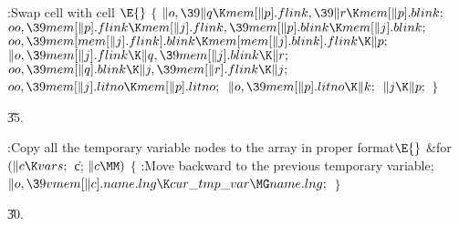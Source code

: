 \Y\B\4:Swap cell  with cell \X${}\E{}$\6
${}\{{}$\1\6
${}\|o,\39\|q\K\\{mem}[\|p].\\{flink},\39\|r\K\\{mem}[\|p].\\{blink};{}$\6
${}\\{oo},\39\\{mem}[\|p].\\{flink}\K\\{mem}[\|j].\\{flink},\39\\{mem}[\|p].%
\\{blink}\K\\{mem}[\|j].\\{blink};{}$\6
${}\\{oo},\39\\{mem}[\\{mem}[\|j].\\{flink}].\\{blink}\K\\{mem}[\\{mem}[\|j].%
\\{blink}].\\{flink}\K\|p;{}$\6
${}\|o,\39\\{mem}[\|j].\\{flink}\K\|q,\39\\{mem}[\|j].\\{blink}\K\|r;{}$\6
${}\\{oo},\39\\{mem}[\|q].\\{blink}\K\|j,\39\\{mem}[\|r].\\{flink}\K\|j;{}$\6
${}\\{oo},\39\\{mem}[\|j].\\{litno}\K\\{mem}[\|p].\\{litno};{}$\6
${}\|o,\39\\{mem}[\|p].\\{litno}\K\|k;{}$\6
${}\|j\K\|p;{}$\6
\4${}\}{}$\2\par
\U35.\fi

\B{}:Copy all the temporary variable nodes to the  array in proper format\X${}\E{}$\6
\&{for} ${}(\|c\K\\{vars};{}$ \|c; ${}\|c\MM){}$\5
${}\{{}$\1\6
:Move  backward to the previous temporary variable\X;%
\6
${}\|o,\39\\{vmem}[\|c].\\{name}.\\{lng}\K\\{cur\_tmp\_var}\MG\\{name}.%
\\{lng};{}$\6
\4${}\}{}$\2\par
\U30.\fi

